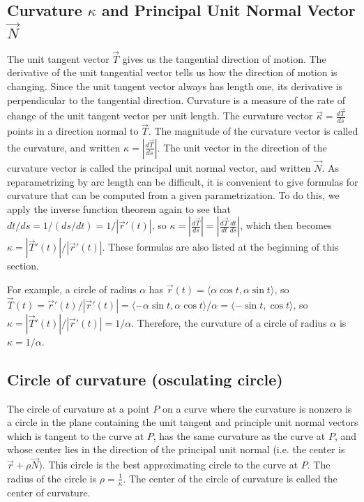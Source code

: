 \subsection{Curvature $\kappa$ and Principal Unit Normal Vector $\vec
N$}
The unit tangent vector {$ \vec T $} gives us the tangential direction
of motion. The derivative of the unit tangential vector tells us how
the direction of motion is changing. Since the unit tangent vector
always has length one, its derivative is perpendicular to the tangential
direction.  Curvature is a measure of the rate of change of the unit
tangent vector per unit length. The curvature vector {$ \vec \kappa =
  \frac{d\vec T}{ds} $} points in a direction normal to {$ \vec T $}.
The magnitude of the curvature vector is called the curvature, and
written {$ \kappa = |\frac{d\vec T}{ds}| $}. The unit vector in the
direction of the curvature vector is called the principal unit normal
vector, and written {$ \vec N $}. As reparametrizing by arc length can
be difficult, it is convenient to give formulas for curvature that can
be computed from a given parametrization. To do this, we apply the
inverse function theorem again to see that $dt/ds = 1/(ds/dt)=1/|\vec
r'(t)|$, so $\kappa=|\frac {d\vec T}{ds}| = |\frac {d\vec T}{dt} \frac
{dt}{ds}|$, which then becomes $\kappa=|\vec T'(t)|/|\vec r'(t)|$.  These
formulas are also listed at the beginning of this section.  

For example, a circle of radius $\alpha$ has $\vec r(t)=\langle\alpha\cos t, \alpha \sin
t\rangle$, so $\vec T(t)=\vec r'(t)/|\vec r'(t)| = \langle-\alpha \sin t, \alpha \cos
t\rangle/\alpha=\langle-\sin t, \cos t\rangle$, so $\kappa=|\vec T'(t)|/|\vec r'(t)|=1/\alpha$.
Therefore, the curvature of a circle of radius $\alpha$ is {$\kappa= 1/\alpha $}.

\subsection{Circle of curvature (osculating circle)}
The circle of curvature at a point $P$ on a curve where the curvature
is nonzero is a circle in the plane containing the unit tangent and
principle unit normal vectors which is tangent to the curve at $P$,
has the same curvature as the curve at $P$, and whose center lies in
the direction of the principal unit normal (i.e. the center is $\vec r
+\rho \vec N$). This circle is the best approximating circle to the curve
at $P$. The radius of the circle is {$ \rho=\frac{1}{\kappa} $}.  The center
of the circle of curvature is called the center of curvature.


